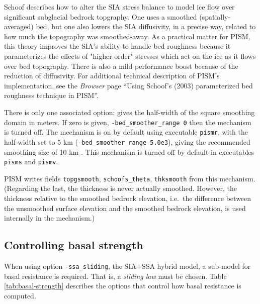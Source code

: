 Schoof \cite{Schoofbasaltopg2003} describes how to alter the SIA stress balance to model ice flow over significant subglacial bedrock topgraphy.  One uses a smoothed (spatially-averaged) bed, but one also lowers the SIA diffusivity, in a precise way, related to how much the topography was smoothed-away.  As a practical matter for PISM, this theory improves the SIA's ability to handle bed roughness because it parameterizes the effects of "higher-order" stresses which act on the ice as it flows over bed topography.  There is also a mild performance boost because of the reduction of diffusivity.  For additional technical description of PISM's implementation, see the \emph{Browser} page ``Using Schoof's (2003) parameterized bed roughness technique in PISM''.

There is only one associated option:  gives the half-width of the square smoothing domain in meters.  If zero is given, \texttt{-bed_smoother_range 0} then the mechanism is turned off.  The mechanism is on by default using executable \texttt{pismr}, with the half-width set to 5 km (\texttt{-bed_smoother_range 5.0e3}), giving the recommended smoothing size of 10 km \cite{Schoofbasaltopg2003}.  This mechanism is turned off by default in executables \texttt{pisms} and \texttt{pismv}.

PISM writes fields \texttt{topgsmooth}, \texttt{schoofs_theta}, \texttt{thksmooth} from this mechanism.  (Regarding the last, the thickness is never actually smoothed.  However, the thickness relative to the smoothed bedrock elevation, i.e.~the difference between the unsmoothed surface elevation and the smoothed bedrock elevation, is used internally in the mechanism.)


\subsection{Controlling basal strength}  \label{subsect:basestrength}

When using option \texttt{-ssa_sliding}, the SIA+SSA hybrid model, a sub-model for basal resistance is required.  That is, a \emph{sliding law} must be chosen.  Table \ref{tab:basal-strength} describes the options that control how basal resistance is computed.

